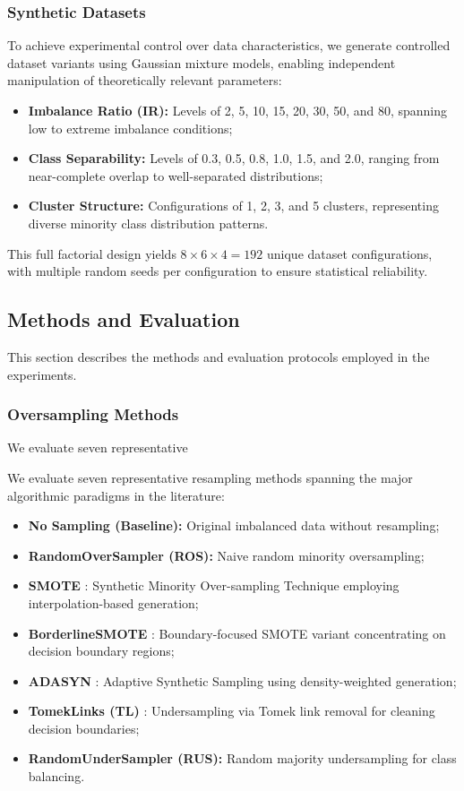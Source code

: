 \documentclass{ijSmartGrid}
\theoremstyle{definition}
\begin{document}
\subsubsection{Synthetic Datasets}
\indent To achieve experimental control over data characteristics, we generate controlled dataset variants using Gaussian mixture models, enabling independent manipulation of theoretically relevant parameters:

\begin{itemize}
    \item \textbf{Imbalance Ratio (IR):} Levels of 2, 5, 10, 15, 20, 30, 50, and 80, spanning low to extreme imbalance conditions;
    \item \textbf{Class Separability:} Levels of 0.3, 0.5, 0.8, 1.0, 1.5, and 2.0, ranging from near-complete overlap to well-separated distributions;
    \item \textbf{Cluster Structure:} Configurations of 1, 2, 3, and 5 clusters, representing diverse minority class distribution patterns.
\end{itemize}

\indent This full factorial design yields $8 \times 6 \times 4 = 192$ unique dataset configurations, with multiple random seeds per configuration to ensure statistical reliability.

\subsection{Methods and Evaluation}
\indent This section describes the methods and evaluation protocols employed in the experiments.

\subsubsection{Oversampling Methods}
\indent We evaluate seven representative

We evaluate seven representative resampling methods spanning the major algorithmic paradigms in the literature:

\begin{itemize}
    \item \textbf{No Sampling (Baseline):} Original imbalanced data without resampling;
    \item \textbf{RandomOverSampler (ROS):} Naive random minority oversampling;
    \item \textbf{SMOTE} \cite{chawla2002smote}: Synthetic Minority Over-sampling Technique employing interpolation-based generation;
    \item \textbf{BorderlineSMOTE} \cite{han2005borderline}: Boundary-focused SMOTE variant concentrating on decision boundary regions;
    \item \textbf{ADASYN} \cite{he2008adasyn}: Adaptive Synthetic Sampling using density-weighted generation;
    \item \textbf{TomekLinks (TL)} \cite{tomek1976two}: Undersampling via Tomek link removal for cleaning decision boundaries;
    \item \textbf{RandomUnderSampler (RUS):} Random majority undersampling for class balancing.
\end{itemize}
\end{document}
